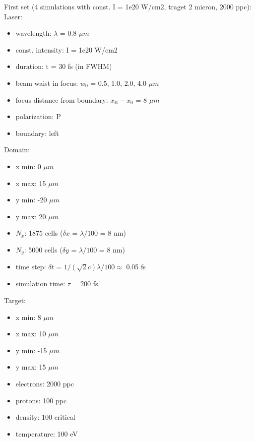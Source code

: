 \noindent
First set (4 simulations with const. I = 1e20 W/cm2, traget 2 micron, 2000 ppc):
\noindent
Laser:
\begin{itemize}
	\item wavelength: $ \lambda $ = 0.8 $ \mu m $
	\item const. intensity: I = 1e20 W/cm2
	\item duration: t = 30 fs (in FWHM)
	\item beam waist in focus: $ w_0 $ = 0.5, 1.0, 2.0, 4.0 $ \mu m $
	\item focus distance from boundary: $ x_\mathrm{B} - x_0 $ = 8 $ \mu m $
	\item polarization: P
	\item boundary: left 
\end{itemize}
Domain:
\begin{itemize}
	\item x min: 0 $ \mu m $
	\item x max: 15 $ \mu m $
	\item y min: -20 $ \mu m $
	\item y max: 20 $ \mu m $
	\item $ N_x $: 1875 cells ($ \delta x $ = $ \lambda/100 $ = 8 nm)
	\item $ N_y $: 5000 cells ($ \delta y $ = $ \lambda/100 $ = 8 nm)
	\item time step: $ \delta t $ = $ 1/(\sqrt{2} c) \lambda /100 \approx $ 0.05 fs 
	\item simulation time: $ \tau $ = 200 fs
\end{itemize}
Target:
\begin{itemize}
	\item x min: 8 $ \mu m $
	\item x max: 10 $ \mu m $
	\item y min: -15 $ \mu m $
	\item y max: 15 $ \mu m $
	\item electrons: 2000 ppc
	\item protons: 100 ppc
	\item density: 100 critical
	\item temperature: 100 eV
\end{itemize}

